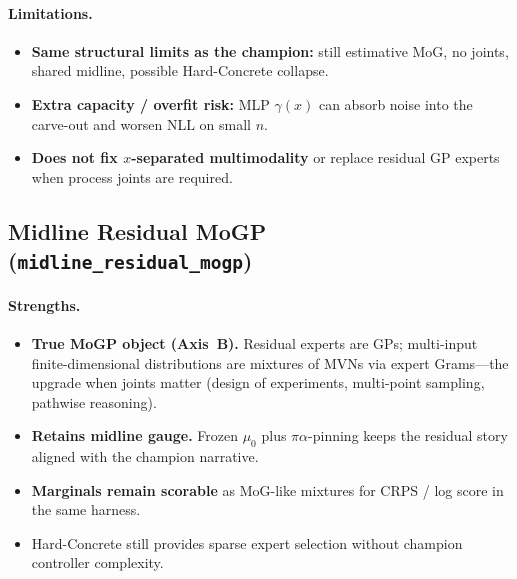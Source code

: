 \documentclass[11pt,a4paper]{article}
\theoremstyle{definition}
\begin{document}
\paragraph{Limitations.}
\begin{itemize}[leftmargin=1.2em,itemsep=2pt]
\item \textbf{Same structural limits as the champion:} still estimative MoG, no
  joints, shared midline, possible Hard-Concrete collapse.
\item \textbf{Extra capacity / overfit risk:} MLP $\gamma(x)$ can absorb noise
  into the carve-out and worsen NLL on small $n$.
\item \textbf{Does not fix $x$-separated multimodality} or replace residual GP
  experts when process joints are required.
\end{itemize}

\subsection{Midline Residual MoGP (\texttt{midline\_residual\_mogp})}

\paragraph{Strengths.}
\begin{itemize}[leftmargin=1.2em,itemsep=2pt]
\item \textbf{True MoGP object (Axis~B).} Residual experts are GPs; multi-input
  finite-dimensional distributions are mixtures of MVNs via expert Grams---the
  upgrade when joints matter (design of experiments, multi-point sampling,
  pathwise reasoning).
\item \textbf{Retains midline gauge.} Frozen $\mu_0$ plus $\pi\alpha$-pinning
  keeps the residual story aligned with the champion narrative.
\item \textbf{Marginals remain scorable} as MoG-like mixtures for CRPS / log
  score in the same harness.
\item Hard-Concrete still provides sparse expert selection without champion
  controller complexity.
\end{itemize}
\end{document}
